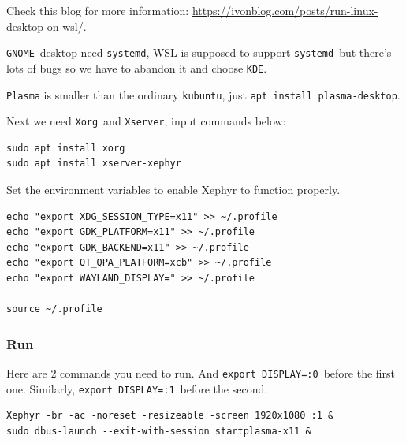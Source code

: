 \documentclass[12pt]{ctexart}
\newenvironment{mdquote}
{%
  \par\noindent
  \begin{list}{}{%
      \setlength{\leftmargin}{1em}%
      \setlength{\rightmargin}{0pt}%
      \setlength{\itemindent}{0pt}%
      \setlength{\listparindent}{\parindent}%
      \setlength{\topsep}{0.5\baselineskip}%
  }
  \item[\textbf{>}\ ]\itshape
}
{\end{list}\par}
\begin{document}
\begin{mdquote}
Check this blog for more information: \href{https://ivonblog.com/posts/run-linux-desktop-on-wsl/}{https://ivonblog.com/posts/run-linux-desktop-on-wsl/}.
\end{mdquote}

\texttt{GNOME}\ desktop need \texttt{systemd}, WSL is supposed to support
\texttt{systemd}\ but there's lots of bugs so we have to
abandon it and choose \texttt{KDE}.

\texttt{Plasma} is smaller than the ordinary \texttt{kubuntu}, just
\texttt{apt\ install\ plasma-desktop}.

Next we need \texttt{Xorg}\ and \texttt{Xserver}, input commands below:

\begin{adjustwidth}{2em}{0pt}
\begin{verbatim}
sudo apt install xorg
sudo apt install xserver-xephyr
\end{verbatim}
\end{adjustwidth}

Set the environment variables to enable Xephyr to function properly.

\fontsize{10}{12}
\begin{adjustwidth}{2em}{0pt}
\begin{verbatim}
echo "export XDG_SESSION_TYPE=x11" >> ~/.profile
echo "export GDK_PLATFORM=x11" >> ~/.profile
echo "export GDK_BACKEND=x11" >> ~/.profile
echo "export QT_QPA_PLATFORM=xcb" >> ~/.profile
echo "export WAYLAND_DISPLAY=" >> ~/.profile

source ~/.profile
\end{verbatim}
\end{adjustwidth}
\fontsize{12}{14}

\subsubsection{\textbf{Run}}

Here are 2 commands you need to run. And \texttt{export\ DISPLAY=:0}\
before the first one. Similarly, \texttt{export\ DISPLAY=:1}\ before the
second.

\begin{adjustwidth}{2em}{0pt}
\begin{verbatim}
Xephyr -br -ac -noreset -resizeable -screen 1920x1080 :1 &
sudo dbus-launch --exit-with-session startplasma-x11 &
\end{verbatim}
\end{adjustwidth}
\end{document}

